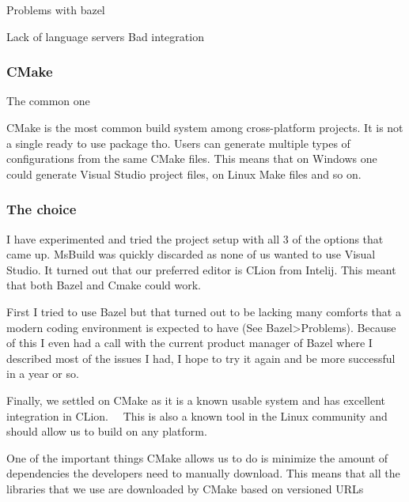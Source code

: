 Problems with bazel

Lack of language servers
Bad integration

\subsubsection{CMake}
The common one

CMake is the most common build system among cross-platform projects.
It is not a single ready to use package tho.
Users can generate multiple types of configurations from the same CMake files.
This means that on Windows one could generate Visual Studio project files, on Linux Make files and so on.

\subsubsection{The choice}
I have experimented and tried the project setup with all 3 of the options that came up.
MsBuild was quickly discarded as none of us wanted to use Visual Studio.
It turned out that our preferred editor is CLion from Intelij.
This meant that both Bazel and Cmake could work.

First I tried to use Bazel but that turned out to be lacking many comforts that a modern coding environment is expected to have (See Bazel>Problems).
Because of this I even had a call with the current product manager of Bazel where I described most of the issues I had, I hope to try it again and be more successful in a year or so.

Finally, we settled on CMake as it is a known usable system and has excellent integration in CLion.
~~This is also a known tool in the Linux community and should allow us to build on any platform.~~

One of the important things CMake allows us to do is minimize the amount of dependencies the developers need to manually download.
This means that all the libraries that we use are downloaded by CMake based on versioned URLs